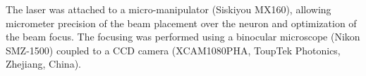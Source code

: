 The laser was attached to a micro-manipulator (Siskiyou MX160), allowing micrometer precision of the beam placement over the neuron and optimization of the beam focus. The focusing was performed using a binocular microscope (Nikon SMZ-1500) coupled to a CCD camera (XCAM1080PHA, ToupTek Photonics, Zhejiang, China).
